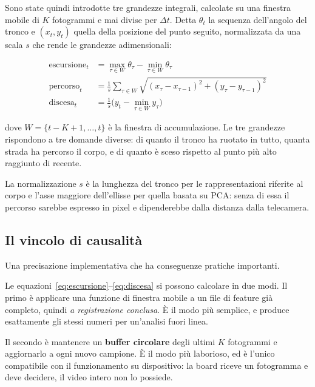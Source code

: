 Sono state quindi introdotte tre grandezze integrali, calcolate su una finestra
mobile di $K$ fotogrammi e mai divise per $\Delta t$. Detta $\theta_t$ la
sequenza dell'angolo del tronco e $(x_t, y_t)$ quella della posizione del punto
seguito, normalizzata da una scala $s$ che rende le grandezze adimensionali:

\begin{align}
\text{escursione}_t &= \max_{\tau \in W} \theta_\tau
                     - \min_{\tau \in W} \theta_\tau
                     \label{eq:escursione}\\[4pt]
\text{percorso}_t   &= \frac{1}{s}\sum_{\tau \in W}
                       \sqrt{(x_\tau - x_{\tau-1})^2 + (y_\tau - y_{\tau-1})^2}
                     \label{eq:percorso}\\[4pt]
\text{discesa}_t    &= \frac{1}{s}\Big( y_t - \min_{\tau \in W} y_\tau \Big)
                     \label{eq:discesa}
\end{align}

dove $W = \{t-K+1,\dots,t\}$ è la finestra di accumulazione. Le tre grandezze
rispondono a tre domande diverse: di quanto il tronco ha ruotato in tutto,
quanta strada ha percorso il corpo, e di quanto è sceso rispetto al punto più
alto raggiunto di recente.

La normalizzazione $s$ è la lunghezza del tronco per le rappresentazioni
riferite al corpo e l'asse maggiore dell'ellisse per quella basata su PCA:
senza di essa il percorso sarebbe espresso in pixel e dipenderebbe dalla
distanza dalla telecamera.

\subsection{Il vincolo di causalità}

Una precisazione implementativa che ha conseguenze pratiche importanti.

Le equazioni~\eqref{eq:escursione}--\eqref{eq:discesa} si possono calcolare in
due modi. Il primo è applicare una funzione di finestra mobile a un file di
feature già completo, quindi \emph{a registrazione conclusa}. È il modo più
semplice, e produce esattamente gli stessi numeri per un'analisi fuori linea.

Il secondo è mantenere un \textbf{buffer circolare} degli ultimi $K$
fotogrammi e aggiornarlo a ogni nuovo campione. È il modo più laborioso, ed è
l'unico compatibile con il funzionamento su dispositivo: la board riceve un
fotogramma e deve decidere, il video intero non lo possiede.

